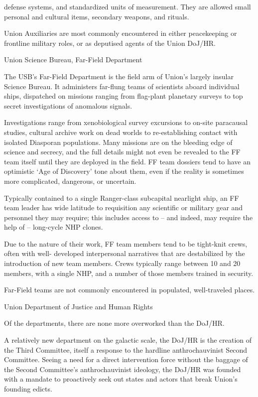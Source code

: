 defense systems, and standardized units of measurement. They are allowed small personal and  
cultural items, secondary weapons, and rituals. 
 

Union Auxiliaries are most commonly encountered in either peacekeeping or frontline military  
roles, or as deputised agents of the Union DoJ/HR.
 

Union Science Bureau, Far-Field Department  

The USB’s Far-Field Department is the field arm of Union’s largely insular Science Bureau. It  
administers far-flung teams of scientists aboard individual ships, dispatched on missions ranging  
from flag-plant planetary surveys to top secret investigations of anomalous signals. 
 

Investigations range from xenobiological survey excursions to on-site paracausal studies,  
cultural archive work on dead worlds to re-establishing contact with isolated Diasporan  
populations. Many missions are on the bleeding edge of science and secrecy, and the full details  
might not even be revealed to the FF team itself until they are deployed in the field. FF team  
dossiers tend to have an optimistic ‘Age of Discovery’ tone about them, even if the reality is  
sometimes more complicated, dangerous, or uncertain.
 

Typically contained to a single Ranger-class subcapital nearlight ship, an FF team leader has  
wide latitude to requisition any scientific or military gear and personnel they may require; this  
includes access to -- and indeed, may require the help of -- long-cycle NHP clones. 
 

Due to the nature of their work, FF team members tend to be tight-knit crews, often with well- 
developed interpersonal narratives that are destabilized by the introduction of new team  
members. Crews typically range between 10 and 20 members, with a single NHP, and a number  
of those members trained in security. 
 

Far-Field teams are not commonly encountered in populated, well-traveled places. 
 

Union Department of Justice and Human Rights  

Of the departments, there are none more overworked than the DoJ/HR.   

A relatively new department on the galactic scale, the DoJ/HR is the creation of the Third  
Committee, itself a response to the hardline anthrochauvinist Second Committee. Seeing a need  
for a direct intervention force without the baggage of the Second Committee’s anthrochauvinist  
ideology, the DoJ/HR was founded with a mandate to proactively seek out states and actors that  
break Union’s founding edicts.   

